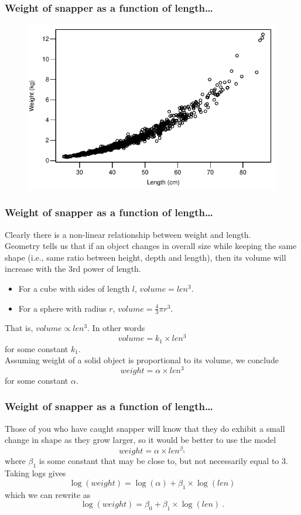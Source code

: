 \documentclass{beamer}\usepackage[]{graphicx}\usepackage[]{xcolor}
\begin{document}
\begin{frame}[fragile]
\frametitle{Weight of snapper as a function of length\ldots}


\begin{figure}
  \centering
  \includegraphics{figure/RC-H07-002}
\end{figure}

\end{frame}


\begin{frame}[fragile]
\frametitle{Weight of snapper as a function of length\ldots}
Clearly there is a non-linear relationship between weight and length.\\
\medskip
Geometry tells us that if an object changes in overall size while keeping the
same shape (i.e., same ratio between height, depth and length), 
then its volume will increase with the 3rd power of length.\\
\medskip
\begin{itemize}
\item For a cube with sides of length $l$, $volume=len^3$.
\item For a sphere with radius $r$, $volume=\frac{4}{3}\pi r^3$.
\end{itemize}
\medskip
That is, $volume \propto len^3$. In other words
\[ 
volume = k_1 \times len^3 
\]
for some constant $k_1$.\\
\medskip
Assuming weight of a solid object is proportional to its volume, we conclude
\[ 
weight = \alpha \times len^3
\]
for some constant $\alpha$.
\end{frame}


\begin{frame}[fragile]
\frametitle{Weight of snapper as a function of length\ldots}
Those of you who have caught snapper will know that they do exhibit a small change 
in shape as they grow larger, so it would be better to use the model
\[ 
weight = \alpha \times len^{\beta_1} 
\]
where $\beta_1$ is some constant that may be close to, but not necessarily equal to 3.\\
\medskip
Taking logs gives
\[ \log(weight) = \log(\alpha) + \beta_1 \times \log(len) \]
which we can rewrite as
\[ \log(weight) = \beta_0 +\beta_1 \times \log(len) \ . \]
\end{frame}
\end{document}
